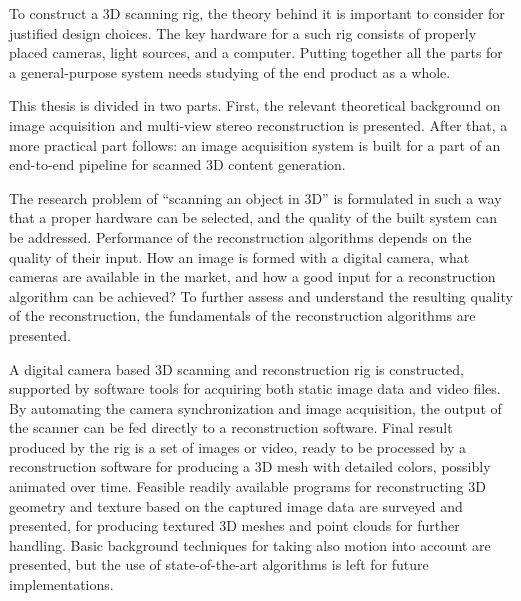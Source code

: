 
To construct a 3D scanning rig, the theory behind it is important to consider for justified design choices.
The key hardware for a such rig consists of properly placed cameras, light sources, and a computer.
Putting together all the parts for a general-purpose system needs studying of the end product as a whole.

This thesis is divided in two parts.
First, the relevant theoretical background on image acquisition and multi-view stereo reconstruction is presented.
After that, a more practical part follows: an image acquisition system is built for a part of an end-to-end pipeline for scanned 3D content generation.

The research problem of ``scanning an object in 3D'' is formulated in such a way that a proper hardware can be selected, and the quality of the built system can be addressed.
Performance of the reconstruction algorithms depends on the quality of their input.
How an image is formed with a digital camera, what cameras are available in the market, and how a good input for a reconstruction algorithm can be achieved?
To further assess and understand the resulting quality of the reconstruction, the fundamentals of the reconstruction algorithms are presented.

A digital camera based 3D scanning and reconstruction rig is constructed, supported by software tools for acquiring both static image data and video files.
By automating the camera synchronization and image acquisition, the output of the scanner can be fed directly to a reconstruction software.
Final result produced by the rig is a set of images or video, ready to be processed by a reconstruction software for producing a 3D mesh with detailed colors, possibly animated over time.
Feasible readily available programs for reconstructing 3D geometry and texture based on the captured image data are surveyed and presented, for producing textured 3D meshes and point clouds for further handling.
Basic background techniques for taking also motion into account are presented, but the use of state-of-the-art algorithms is left for future implementations.


